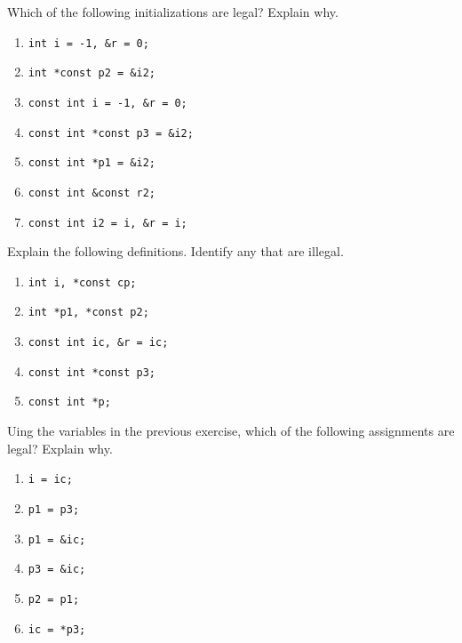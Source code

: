 %
%
\begin{question}
Which of the following initializations are legal? Explain why.
\begin{enumerate}[label=(\alph*)]
^^I\item \verb|int i = -1, &r = 0;|
^^I\item \verb|int *const p2 = &i2;|
^^I\item \verb|const int i = -1, &r = 0;|
^^I\item \verb|const int *const p3 = &i2;|
^^I\item \verb|const int *p1 = &i2;|
^^I\item \verb|const int &const r2;|
^^I\item \verb|const int i2 = i, &r = i;|
\end{enumerate}
\end{question}

\begin{question}
Explain the following definitions. Identify any that are illegal.
\begin{enumerate}[label=(\alph*)]
^^I\item \verb|int i, *const cp;|
^^I\item \verb|int *p1, *const p2;|
^^I\item \verb|const int ic, &r = ic;|
^^I\item \verb|const int *const p3;|
^^I\item \verb|const int *p;|
\end{enumerate}
\end{question}

\begin{question}
Uing the variables in the previous exercise, which of the
following assignments are legal? Explain why.
\begin{enumerate}[label=(\alph*)]
^^I\item \verb|i = ic;|
^^I\item \verb|p1 = p3;|
^^I\item \verb|p1 = &ic;|
^^I\item \verb|p3 = &ic;|
^^I\item \verb|p2 = p1;|
^^I\item \verb|ic = *p3;|
\end{enumerate}
\end{question}
